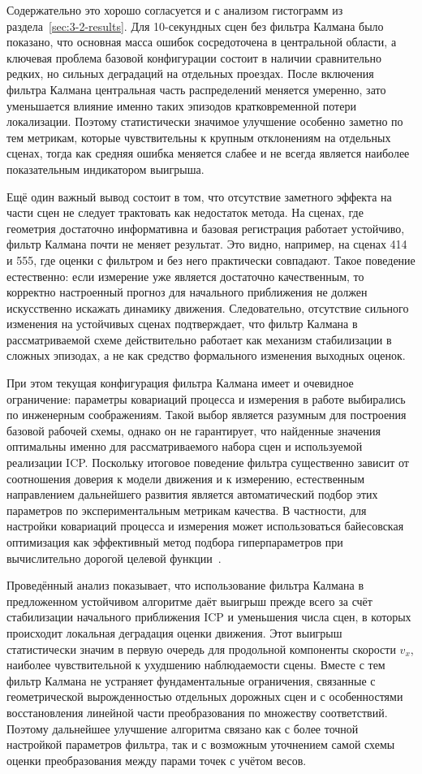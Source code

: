 Содержательно это хорошо согласуется и с анализом гистограмм из раздела~\ref{sec:3-2-results}. Для 10-секундных сцен без фильтра Калмана было показано, что основная масса ошибок сосредоточена в центральной области, а ключевая проблема базовой конфигурации состоит в наличии сравнительно редких, но сильных деградаций на отдельных проездах. После включения фильтра Калмана центральная часть распределений меняется умеренно, зато уменьшается влияние именно таких эпизодов кратковременной потери локализации. Поэтому статистически значимое улучшение особенно заметно по тем метрикам, которые чувствительны к крупным отклонениям на отдельных сценах, тогда как средняя ошибка меняется слабее и не всегда является наиболее показательным индикатором выигрыша.

Ещё один важный вывод состоит в том, что отсутствие заметного эффекта на части сцен не следует трактовать как недостаток метода. На сценах, где геометрия достаточно информативна и базовая регистрация работает устойчиво, фильтр Калмана почти не меняет результат. Это видно, например, на сценах 414 и 555, где оценки с фильтром и без него практически совпадают. Такое поведение естественно: если измерение уже является достаточно качественным, то корректно настроенный прогноз для начального приближения не должен искусственно искажать динамику движения. Следовательно, отсутствие сильного изменения на устойчивых сценах подтверждает, что фильтр Калмана в рассматриваемой схеме действительно работает как механизм стабилизации в сложных эпизодах, а не как средство формального изменения выходных оценок.

При этом текущая конфигурация фильтра Калмана имеет и очевидное ограничение: параметры ковариаций процесса и измерения в работе выбирались по инженерным соображениям. Такой выбор является разумным для построения базовой рабочей схемы, однако он не гарантирует, что найденные значения оптимальны именно для рассматриваемого набора сцен и используемой реализации ICP. Поскольку итоговое поведение фильтра существенно зависит от соотношения доверия к модели движения и к измерению, естественным направлением дальнейшего развития является автоматический подбор этих параметров по экспериментальным метрикам качества. В частности, для настройки ковариаций процесса и измерения может использоваться байесовская оптимизация как эффективный метод подбора гиперпараметров при вычислительно дорогой целевой функции~\cite{yandex-bayes-opt}.

Проведённый анализ показывает, что использование фильтра Калмана в предложенном устойчивом алгоритме даёт выигрыш прежде всего за счёт стабилизации начального приближения ICP и уменьшения числа сцен, в которых происходит локальная деградация оценки движения. Этот выигрыш статистически значим в первую очередь для продольной компоненты скорости \(v_x\), наиболее чувствительной к ухудшению наблюдаемости сцены. Вместе с тем фильтр Калмана не устраняет фундаментальные ограничения, связанные с геометрической вырожденностью отдельных дорожных сцен и с особенностями восстановления линейной части преобразования по множеству соответствий. Поэтому дальнейшее улучшение алгоритма связано как с более точной настройкой параметров фильтра, так и с возможным уточнением самой схемы оценки преобразования между парами точек с учётом весов.
